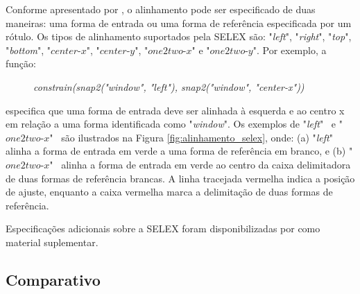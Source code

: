 Conforme apresentado por , o alinhamento pode ser especificado de duas maneiras: uma forma de entrada ou uma forma de referência especificada por um rótulo. Os tipos de alinhamento suportados pela \gls{SELEX} são: "\textit{left}", "\textit{right}", "\textit{top}", "\textit{bottom}", "$center\mbox{-}x$", "$center\mbox{-}y$", "$one2two\mbox{-}x$" e "$one2two\mbox{-}y$". Por exemplo, a função:

\vspace{0.3cm}

\begin{description}
    \item[] \qquad \qquad \textit{constrain(snap2("window", "left"), snap2("window", "center\mbox{-}x"))}
\end{description}

\vspace{0.3cm}

\noindent especifica que uma forma de entrada deve ser alinhada à esquerda e ao centro x em relação a uma forma identificada como "\textit{window}". Os exemplos de "\textit{left}" \, e "$one2two\mbox{-}x$" \, são ilustrados na Figura \ref{fig:alinhamento_selex}, onde: (a) "\textit{left}" \, alinha a forma de entrada em verde a uma forma de referência em branco, e (b) "$one2two\mbox{-}x$" \, alinha a forma de entrada em verde ao centro da caixa delimitadora de duas formas de referência brancas. A linha tracejada vermelha indica a posição de ajuste, enquanto a caixa vermelha marca a delimitação de duas formas de referência.

\begin{figure}[h!]
	\centering
	\captionsetup{width=15cm}
	{}	
\end{figure}

Especificações adicionais sobre a \gls{SELEX} foram disponibilizadas por  como material suplementar.

\subsection{Comparativo}
\label{sec:comparativo}

